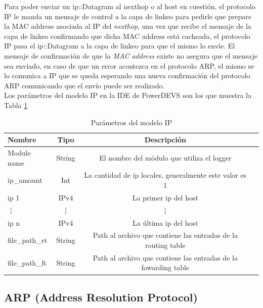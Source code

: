 \documentclass[10pt,a4paper]{article}
\begin{document}
Para poder enviar un ip::Datagram al nexthop o al host en cuestión, el protocolo IP le manda un mensaje de control a la capa de linkeo para pedirle que prepare la MAC address asociada al IP del \textit{nexthop}, una vez que recibe el mensaje de la capa de linkeo confirmando que dicha MAC address está cacheada, el protocolo IP pasa el ip::Datagram a la capa de linkeo para que el mismo lo envíe. El mensaje de confirmación de que la \textit{MAC address} existe no asegura que el mensaje sea enviado, en caso de que un error acontezca en el protocolo ARP, el mismo se lo comunica a IP que se queda esperando una nueva confirmación del protocolo ARP comunicando que el envío puede ser realizado. \\

Los parámetros del modelo IP en la IDE de PowerDEVS son los que muestra la Tabla \ref{table: parameters ip}

\begin{table}[h]
\begin{tabular}{|l|c|c|c|}
  \hline
  \textbf{Nombre} & \textbf{Tipo} & \textbf{Descripción} \\
  \hline
  Module name & String & El nombre del módulo que utiliza el logger \\
  \hline
  ip\_amount & Int & La cantidad de ip locales, generalmente este valor es 1 \\
  \hline
  ip 1 & IPv4 & La primer ip del host \\
  \hline
  \vdots & \vdots & \vdots \\
  \hline
  ip n & IPv4 & La última ip del host \\
  \hline
  file\_path\_rt & String & Path al archivo que contiene las entradas de la routing table \\
  \hline
  file\_path\_ft & String & Path al archivo que contiene las entradas de la fowarding table \\
  \hline
\end{tabular}
\caption{Parámetros del modelo IP}
\label{table: parameters ip}
\end{table}

\subsection{ARP (Address Resolution Protocol)}
\end{document}

